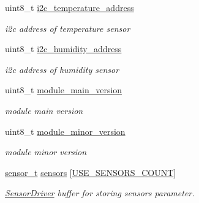 \begin{DoxyCompactItemize}
\mbox{\label{structconfiguration__t_aed0a51c0dfbd925368c8539cf10c3001}} 
uint8\+\_\+t \hyperlink{structconfiguration__t_aed0a51c0dfbd925368c8539cf10c3001}{i2c\+\_\+temperature\+\_\+address}
\begin{DoxyCompactList}\small\item\em i2c address of temperature sensor \end{DoxyCompactList}\item 
\mbox{\label{structconfiguration__t_a79d1b1d9cb095c2bc0deb36c4f44452c}} 
uint8\+\_\+t \hyperlink{structconfiguration__t_a79d1b1d9cb095c2bc0deb36c4f44452c}{i2c\+\_\+humidity\+\_\+address}
\begin{DoxyCompactList}\small\item\em i2c address of humidity sensor \end{DoxyCompactList}\item 
\mbox{\label{structconfiguration__t_a97b092b86e587a9861332fc7108d68b9}} 
uint8\+\_\+t \hyperlink{structconfiguration__t_a97b092b86e587a9861332fc7108d68b9}{module\+\_\+main\+\_\+version}
\begin{DoxyCompactList}\small\item\em module main version \end{DoxyCompactList}\item 
\mbox{\label{structconfiguration__t_ae0f86b63e57181bf52331096153a2515}} 
uint8\+\_\+t \hyperlink{structconfiguration__t_ae0f86b63e57181bf52331096153a2515}{module\+\_\+minor\+\_\+version}
\begin{DoxyCompactList}\small\item\em module minor version \end{DoxyCompactList}\item 
\mbox{\label{structconfiguration__t_adede74f3da6d26f5bc4b5e64e4776f7f}} 
\hyperlink{structsensor__t}{sensor\+\_\+t} \hyperlink{structconfiguration__t_adede74f3da6d26f5bc4b5e64e4776f7f}{sensors} \mbox{[}\hyperlink{rmap-config_8h_af18dc3de744722cb308451b7a705611b}{U\+S\+E\+\_\+\+S\+E\+N\+S\+O\+R\+S\+\_\+\+C\+O\+U\+NT}\mbox{]}
\begin{DoxyCompactList}\small\item\em \hyperlink{classSensorDriver}{Sensor\+Driver} buffer for storing sensors parameter. \end{DoxyCompactList}\item 

\end{DoxyCompactItemize}
